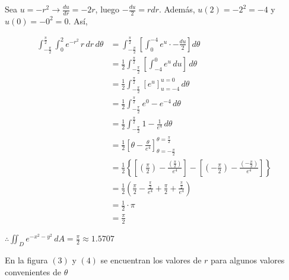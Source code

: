 \documentclass[12pt]{exam}
\begin{document}
\begin{questions}
\begin{enumerate}[a)]
    
    Sea $u=-r^2 \rightarrow \frac{du}{dr}=-2r$, luego $-\frac{du}{2}=rdr$. Además, $u(2)=-2^2=-4$ y $u(0)=-0^2=0$. Así,

    \begin{align*}
      \int_{-\frac{\pi}{2}}^{\frac{\pi}{2}}\int_0^2
      e^{-r^2}\,r\,dr\,d\theta
      &= \int_{-\frac{\pi}{2}}^{\frac{\pi}{2}}\left[\int_{0}^{-4} e^{u}\cdot -\frac{du}{2}\right]d\theta \\
      &= \frac{1}{2}\int_{-\frac{\pi}{2}}^{\frac{\pi}{2}} \left[\int_{-4}^0 e^u \, du\right] \,d\theta \\
      &= \frac{1}{2}\int_{-\frac{\pi}{2}}^{\frac{\pi}{2}} \left[ e^u \right]_{u=-4}^{u=0} \,d\theta \\
      &= \frac{1}{2}\int_{-\frac{\pi}{2}}^{\frac{\pi}{2}} e^0-e^{-4} \,d\theta \\
      &= \frac{1}{2}\int_{-\frac{\pi}{2}}^{\frac{\pi}{2}} 1-\frac{1}{e^4} \,d\theta \\
      &= \frac{1}{2}\left[ \theta -\frac{\theta}{e^4} \right]_{\theta=-\frac{\pi}{2}}^{\theta=\frac{\pi}{2}} \\
      &= \frac{1}{2} \left\{\left[ \left(\frac{\pi}{2}\right) -\frac{\left(\frac{\pi}{2}\right)}{e^4} \right] - \left[ \left(-\frac{\pi}{2}\right) -\frac{\left(-\frac{\pi}{2}\right)}{e^4} \right] \right\}\\
      &= \frac{1}{2} \left( \frac{\pi}{2} - \frac{\frac{\pi}{2}}{e^4} + \frac{\pi}{2} + \frac{\frac{\pi}{2}}{e^4}\right) \\
      &= \frac{1}{2} \cdot \pi \\
      &= \frac{\pi}{2}
    \end{align*}

    $\therefore \iint_D e^{-x^2-y^2}\,dA = \frac{\pi}{2} \approx 1.5707$   
    
  \end{enumerate}


  En la figura $(3)$ y $(4)$ se encuentran los valores de $r$ para algunos valores convenientes de $\theta$
  

\end{questions}
\end{document}
